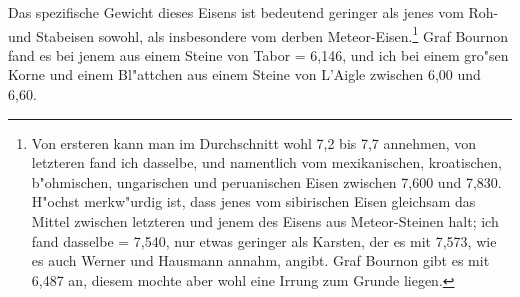 \documentclass[a4paper, 11pt, oneside, german]{article}
\begin{document}
Das spezifische Gewicht dieses Eisens ist bedeutend geringer als jenes vom Roh- und Stabeisen sowohl, als insbesondere vom derben Meteor-Eisen.\footnote{Von ersteren kann man im Durchschnitt wohl 7,2 bis 7,7 annehmen, von letzteren fand ich dasselbe, und namentlich vom mexikanischen, kroatischen, b"ohmischen, ungarischen und peruanischen Eisen zwischen 7,600 und 7,830. H"ochst merkw"urdig ist, dass jenes vom sibirischen Eisen gleichsam das Mittel zwischen letzteren und jenem des Eisens aus Meteor-Steinen halt; ich fand dasselbe = 7,540, nur etwas geringer als Karsten, der es mit 7,573, wie es auch Werner und Hausmann annahm, angibt. Graf Bournon gibt es mit 6,487 an, diesem mochte aber wohl eine Irrung zum Grunde liegen.} Graf Bournon fand es bei jenem aus einem Steine von Tabor = 6,146, und ich bei einem gro"sen Korne und einem Bl"attchen aus einem Steine von L'Aigle zwischen 6,00 und 6,60.
\end{document}
